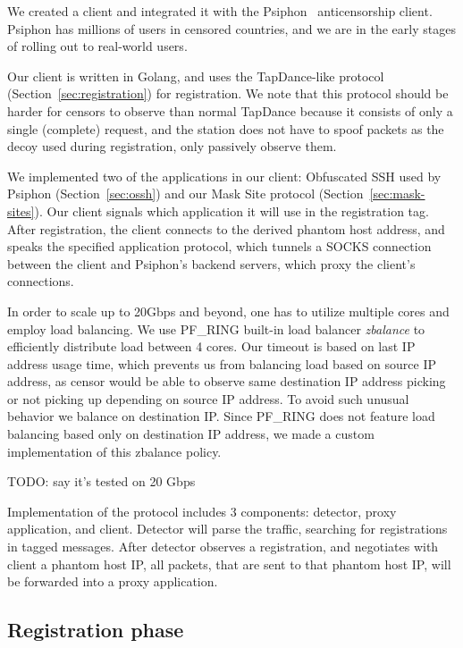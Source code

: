 \documentclass[sigconf]{acmart}
\begin{document}
We created a \scheme client and integrated it with the Psiphon~\cite{psiphon}
anticensorship client. Psiphon has millions of users in censored countries, and
we are in the early stages of rolling \scheme out to real-world users.

Our \scheme client is written in Golang, and uses the TapDance-like protocol
(Section~\ref{sec:registration}) for
registration. We note that this protocol should be harder for censors to observe
than normal TapDance because it consists of only a single (complete) request, and the station does
not have to spoof packets as the decoy used during registration, only passively
observe them.

We implemented two of the applications in our client: Obfuscated SSH used by
Psiphon
(Section~\ref{sec:ossh}) and our Mask Site protocol
(Section~\ref{sec:mask-sites}). Our client signals which application it will use
in the registration tag. After registration, the client connects to the derived
phantom host address, and speaks the specified application protocol, which
tunnels a SOCKS connection between the client and Psiphon's backend servers,
which proxy the client's connections.

In order to scale up to 20Gbps and beyond,
one has to utilize multiple cores and employ load balancing.
We use PF\_RING built-in load balancer \emph{zbalance} to efficiently
distribute load between 4 cores.
Our timeout is based on last IP address usage time, which prevents us from
balancing load based on source IP address,
as censor would be able to observe
same destination IP address picking or not picking up
depending on source IP address.
To avoid such unusual behavior we balance on destination IP.
Since PF\_RING does not feature load balancing based only on destination
IP address, we made a custom implementation of this zbalance policy.

TODO: say it's tested on 20 Gbps

Implementation of the protocol includes 3 components:
detector, proxy application, and client.
Detector will parse the traffic, searching for registrations in
tagged messages. After detector observes a registration, and negotiates with client
a phantom host IP,
all packets, that are sent to that phantom host IP,
will be forwarded into a proxy application.

\subsection{Registration phase}
\end{document}
